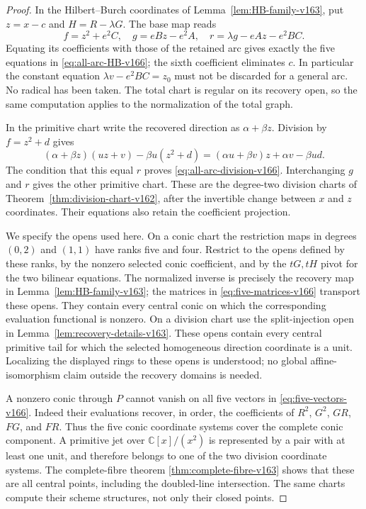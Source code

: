 \documentclass[11pt,reqno]{amsart}
\numberwithin{equation}{section}
\theoremstyle{definition}\newtheorem{definition}[theorem]{Definition}
\theoremstyle{remark}\newtheorem{remark}[theorem]{Remark}
\newcommand{\C}{\mathbb C}\newcommand{\Q}{\mathbb Q}
\begin{document}
\begin{proof}
In the Hilbert--Burch coordinates of
Lemma~\ref{lem:HB-family-v163}, put $z=x-c$ and $H=R-\lambda G$.
The base map reads
\[
 f=z^2+e^2C,\quad g=eBz-e^2A,\quad
 r=\lambda g-eAz-e^2BC.
\]
Equating its coefficients with those of the retained arc gives
exactly the five equations in \eqref{eq:all-arc-HB-v166}; the sixth
coefficient eliminates $c$. In particular the constant equation
$\lambda v-e^2BC=z_0$ must not be discarded for a general arc.
No radical has been taken. The total chart is regular on its
recovery open, so the same computation applies to the normalization
of the total graph.

In the primitive chart write the recovered direction as
$\alpha+\beta z$. Division by $f=z^2+d$ gives
\[
 (\alpha+\beta z)(uz+v)-\beta u(z^2+d)
       =(\alpha u+\beta v)z+\alpha v-\beta ud.
\]
The condition that this equal $r$ proves
\eqref{eq:all-arc-division-v166}. Interchanging $g$ and $r$ gives
the other primitive chart. These are the degree-two division charts
of Theorem~\ref{thm:division-chart-v162}, after the invertible change
between $x$ and $z$ coordinates. Their equations also retain the
coefficient projection.

We specify the opens used here. On a conic chart the restriction maps
in degrees $(0,2)$ and $(1,1)$ have ranks five and four. Restrict to
the opens defined by these ranks, by the nonzero selected conic
coefficient, and by the $tG,tH$ pivot for the two bilinear equations.
The normalized inverse is precisely the recovery map in
Lemma~\ref{lem:HB-family-v163}; the matrices in
\eqref{eq:five-matrices-v166} transport these opens. They contain
every central conic on which the corresponding evaluation functional
is nonzero. On a division chart use the split-injection open in
Lemma~\ref{lem:recovery-details-v163}. These opens contain every
central primitive tail for which the selected homogeneous direction
coordinate is a unit. Localizing the displayed rings to these opens
is understood; no global affine-isomorphism claim outside the
recovery domains is needed.

A nonzero conic through $P$ cannot vanish on all five vectors in
\eqref{eq:five-vectors-v166}. Indeed their evaluations recover,
in order, the coefficients of $R^2$, $G^2$, $GR$, $FG$, and $FR$.
Thus the five conic coordinate systems cover the complete conic
component. A primitive jet over $\C[x]/(x^2)$ is represented by a
pair with at least one unit, and therefore belongs to one of the two
division coordinate systems. The complete-fibre theorem
\ref{thm:complete-fibre-v163} shows that these are all central
points, including the doubled-line intersection. The same charts
compute their scheme structures, not only their closed points.


\end{proof}
\end{document}
